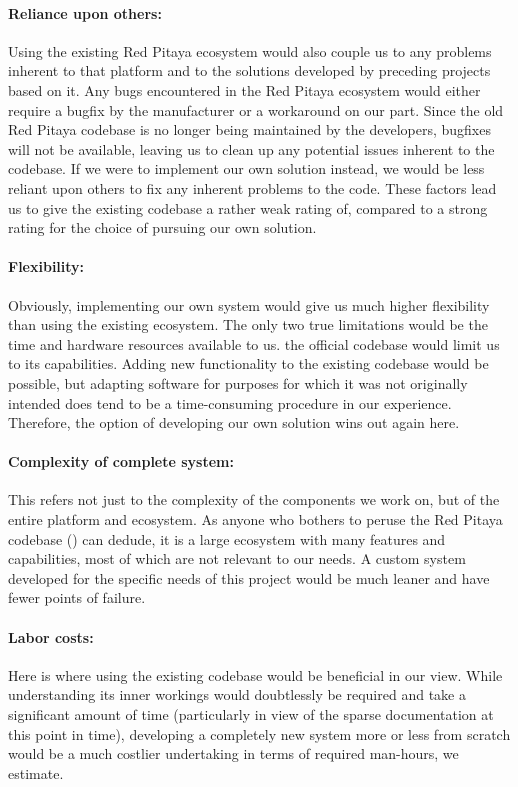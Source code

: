 \paragraph{Reliance  upon others:} Using  the  existing  Red Pitaya  ecosystem
would also  couple us  to any problems  inherent to that  platform and  to the
solutions developed by preceding projects based on it. Any bugs encountered in
the Red Pitaya ecosystem would either  require a bugfix by the manufacturer or
a workaround on our part. Since the old Red Pitaya codebase is no longer being
maintained by  the developers, bugfixes will  not be available, leaving  us to
clean  up  any potential  issues  inherent  to  the  codebase. If we  were  to
implement our  own solution instead, we  would be less reliant  upon others to
fix  any inherent  problems to  the code. These  factors lead  us to  give the
existing codebase a rather weak rating of, compared to a strong rating for the
choice of pursuing our own solution.

\paragraph{Flexibility:} Obviously, implementing our own  system would give us
much higher flexibility  than using the existing ecosystem. The  only two true
limitations would  be the  time and  hardware resources  available to  us. the
official codebase would limit us to its capabilities. Adding new functionality
to the existing codebase would be possible, but adapting software for purposes
for which  it was  not originally  intended does tend  to be  a time-consuming
procedure  in our  experience.  Therefore,  the option  of developing  our own
solution wins out again here.

\paragraph{Complexity  of  complete  system:} This  refers  not  just  to  the
complexity  of  the  components  we  work  on,  but  of  the  entire  platform
and  ecosystem. As  anyone who  bothers  to  peruse  the Red  Pitaya  codebase
(\cite{pita:github}) can  dedude, it is  a large ecosystem with  many features
and capabilities, most of which are not relevant to our needs. A custom system
developed for the specific needs of this project would be much leaner and have
fewer points of failure.

\paragraph{Labor  costs:} Here  is where  using  the  existing codebase  would
be  beneficial  in our  view. While  understanding  its inner  workings  would
doubtlessly be required and take a significant amount of time (particularly in
view  of  the sparse  documentation  at  this  point  in time),  developing  a
completely  new system  more or  less from  scratch would  be a  much costlier
undertaking in terms of required man-hours, we estimate.

